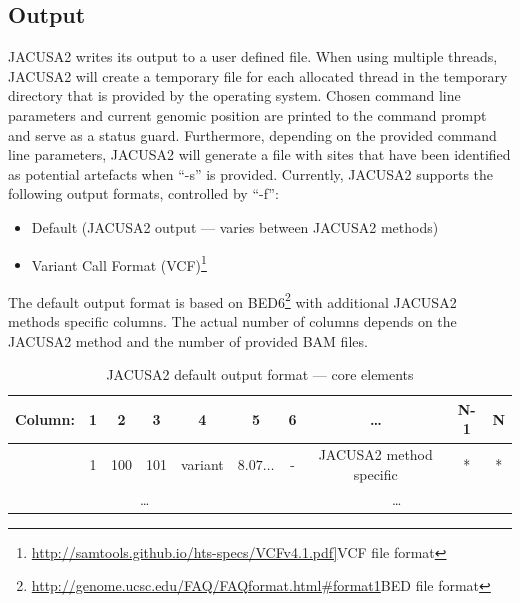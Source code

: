 \documentclass[10pt,a4paper]{article}
\begin{document}
\subsection{Output}
JACUSA2 writes its output to a user defined file. When using multiple threads, JACUSA2 will
create a temporary file for each allocated thread in the temporary directory that is provided by the operating system. 
Chosen command line parameters and current genomic position are printed to the command prompt and serve as a status guard.
Furthermore, depending on the provided command line parameters, JACUSA2 will generate a file with sites that have been
identified as potential artefacts when ``-s'' is provided. Currently, JACUSA2 supports the following
output formats, controlled by ``-f'':
\begin{itemize}
  \item Default (JACUSA2 output --- varies between JACUSA2 methods)
  \item Variant Call Format (VCF)\footnote{\url{http://samtools.github.io/hts-specs/VCFv4.1.pdf]}{VCF file format}}
\end{itemize}
The default output format is based on
BED6\footnote{\url{http://genome.ucsc.edu/FAQ/FAQformat.html\#format1}{BED file format}} with
additional JACUSA2 methods specific columns. The actual number of columns depends on the JACUSA2 
method and the number of provided BAM files.
\begin{table}[ht]
\caption{JACUSA2 default output format --- core elements}
{\small
\begin{tabular}{lcccccc|ccc}
Column: & 1 & 2 & 3 & 4 & 5 & 6 & \ldots & N-1 & N \\
\hline
& 1 & 100 & 101 & variant & $8.07\ldots$ & - & JACUSA2 method specific & * & * \\	
\multicolumn{6}{c|}{\ldots} & \multicolumn{4}{c}{\ldots}
\end{tabular}}
\end{table}
\end{document}
